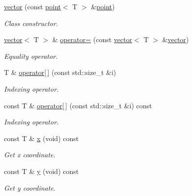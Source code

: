 \begin{DoxyCompactItemize}
\hyperlink{classddd_1_1vector_a0ac6eee190f95425480a001947644fa4}{vector} (const \hyperlink{classddd_1_1point}{point}$<$ T $>$ \&\hyperlink{classddd_1_1point}{point})
\begin{DoxyCompactList}\small\item\em Class constructor. \end{DoxyCompactList}\item 
\hyperlink{classddd_1_1vector}{vector}$<$ T $>$ \& \hyperlink{classddd_1_1vector_a873d3b0fd4d4a5d7a1b6a9d7e907009d}{operator=} (const \hyperlink{classddd_1_1vector}{vector}$<$ T $>$ \&\hyperlink{classddd_1_1vector}{vector})
\begin{DoxyCompactList}\small\item\em Equality operator. \end{DoxyCompactList}\item 
T \& \hyperlink{classddd_1_1vector_a38e2123649fc4ebf839f22e5061b9497}{operator\mbox{[}$\,$\mbox{]}} (const std\+::size\+\_\+t \&i)
\begin{DoxyCompactList}\small\item\em Indexing operator. \end{DoxyCompactList}\item 
const T \& \hyperlink{classddd_1_1vector_a7e8d544a596450edb30914dcc21159fc}{operator\mbox{[}$\,$\mbox{]}} (const std\+::size\+\_\+t \&i) const
\begin{DoxyCompactList}\small\item\em Indexing operator. \end{DoxyCompactList}\item 
\mbox{\label{classddd_1_1vector_a1108468dc6ce04acf1d74949177c97b3}} 
const T \& \hyperlink{classddd_1_1vector_a1108468dc6ce04acf1d74949177c97b3}{x} (void) const
\begin{DoxyCompactList}\small\item\em Get x coordinate. \end{DoxyCompactList}\item 
\mbox{\label{classddd_1_1vector_a678928885fa7bcdb22f25eff71f74cdd}} 
const T \& \hyperlink{classddd_1_1vector_a678928885fa7bcdb22f25eff71f74cdd}{y} (void) const
\begin{DoxyCompactList}\small\item\em Get y coordinate. \end{DoxyCompactList}\item 
\mbox{\label{classddd_1_1vector_a6f9a297e7ba387597ca0515421012166}} 

\end{DoxyCompactItemize}
